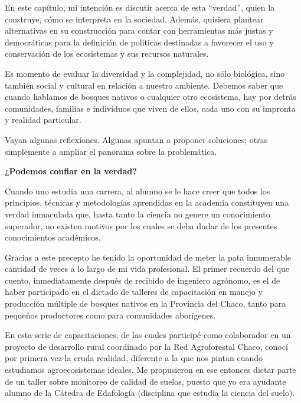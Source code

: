 \begin{fullwidth}
En este capítulo, mi intención es discutir acerca de esta ``verdad'',
quien la construye, cómo se interpreta en la sociedad. Además, quisiera
plantear alternativas en su construcción para contar con herramientas
más justas y democráticas para la definición de políticas destinadas a
favorecer el uso y conservación de los ecosistemas y sus recursos
naturales.

Es momento de evaluar la diversidad y la complejidad, no sólo biológica,
sino también social y cultural en relación a nuestro ambiente. Debemos
saber que cuando hablamos de bosques nativos o cualquier otro
ecosistema, hay por detrás comunidades, familias e individuos que viven
de ellos, cada uno con su impronta y realidad particular.

Vayan algunas reflexiones. Algunas apuntan a proponer soluciones; otras
simplemente a ampliar el panorama sobre la problemática.

\textbf{¿Podemos confiar en la verdad?}

Cuando uno estudia una carrera, al alumno se le hace creer que todos los
principios, técnicas y metodologías aprendidas en la academia
constituyen una verdad inmaculada que, hasta tanto la ciencia no genere
un conocimiento superador, no existen motivos por los cuales se deba
dudar de los presentes conocimientos académicos.

Gracias a este precepto he tenido la oportunidad de meter la pata
innumerable cantidad de veces a lo largo de mi vida profesional. El
primer recuerdo del que cuento, inmediatamente después de recibido de
ingeniero agrónomo, es el de haber participado en el dictado de talleres
de capacitación en manejo y producción múltiple de bosques nativos en la
Provincia del Chaco, tanto para pequeños productores como para
comunidades aborígenes.

En esta serie de capacitaciones, de las cuales participé como
colaborador en un proyecto de desarrollo rural coordinado por la Red
Agroforestal Chaco, conocí por primera vez la cruda realidad, diferente
a la que nos pintan cuando estudiamos agroecosistemas ideales. Me
propusieron en ese entonces dictar parte de un taller sobre monitoreo de
calidad de suelos, puesto que yo era ayudante alumno de la Cátedra de
Edafología (disciplina que estudia la ciencia del suelo).


\end{fullwidth}
